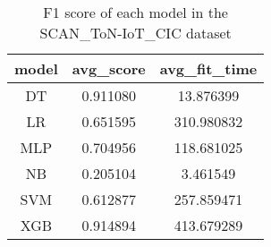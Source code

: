 \begin{table}[H]
\centering
\caption{F1 score of each model in the SCAN_ToN-IoT_CIC dataset}
\label{f1_valid_scan_ton-iot_cic}
\begin{tabular}{ccc}
\toprule
model &  avg\_score &  avg\_fit\_time \\
\midrule
   DT &   0.911080 &     13.876399 \\
   LR &   0.651595 &    310.980832 \\
  MLP &   0.704956 &    118.681025 \\
   NB &   0.205104 &      3.461549 \\
  SVM &   0.612877 &    257.859471 \\
  XGB &   0.914894 &    413.679289 \\
\bottomrule
\end{tabular}
\end{table}
